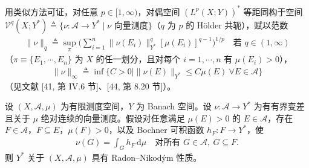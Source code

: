 \documentclass[../../main.tex]{subfiles}%
\begin{document}
\begin{remark}\label{remark:ch04-对偶向量测度刻画}
用类似方法可证，对任意 $p\in[1,\infty)$，对偶空间 $(L^p(X;Y))^*$ 等距同构于空间 $\mathcal{V}^q(X;Y^*)\triangleq \{\nu:\mathcal{A}\to Y^*\mid \nu\text{ 向量测度}\}$（$q$ 为 $p$ 的 Hölder 共轭），赋以范数
\begin{align*}
\|\nu\|_q\triangleq \sup_{\pi}\Big(\sum_{i=1}^n\|\nu(E_i)\|_{Y^*}^q[\mu(E_i)]^{q-1}\Big)^{1/p}\quad\text{若 }q\in(1,\infty)
\end{align*}
（$\pi\equiv\{E_1,\cdots ,E_n\}$ 为 $X$ 的任一划分，且对每个 $i=1,\cdots ,n$ 有 $\mu(E_i)>0$），
\begin{align*}
\|\nu\|_\infty\triangleq \inf\{C>0\mid\|\nu(E)\|_{Y^*}\leqslant C\mu(E)\ \forall E\in\mathcal{A}\}
\end{align*}
（见文献 [41, 第 IV.6 节]、[44, 第 8.20 节]）。
\end{remark}

\begin{lemma}\label{lemma:ch04-RNP局部}
设 $(X,\mathcal{A},\mu)$ 为有限测度空间，$Y$ 为 Banach 空间。设 $\nu:\mathcal{A}\to Y^*$ 为有有界变差且关于 $\mu$ 绝对连续的向量测度。假设对任意满足 $\mu(E)>0$ 的 $E\in\mathcal{A}$，存在 $F\in\mathcal{A}$，$F\subseteq E$，$\mu(F)>0$，以及 Bochner 可积函数 $h_F:F\to Y^*$，使
\begin{align}
\nu(G)=\int_G h_F\,\mathrm{d}\mu\quad\text{对所有 }G\in\mathcal{A},\ G\subseteq F. \label{align:ch04-4.94}
\end{align}
则 $Y^*$ 关于 $(X,\mathcal{A},\mu)$ 具有 Radon--Nikodým 性质。
\end{lemma}
\end{document}
